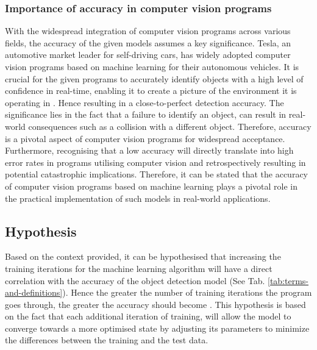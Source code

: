 \subsubsection{Importance of accuracy in computer vision programs}
With the widespread integration of computer vision programs across various fields, the accuracy of the given models assumes a key significance. Tesla, an automotive market leader for self-driving cars, has widely adopted computer vision programs based on machine learning for their autonomous vehicles. It is crucial for the given programs to accurately identify objects with a high level of confidence in real-time, enabling it to create a picture of the environment it is operating in \parencite{Baeldung2022}. Hence resulting in a close-to-perfect detection accuracy. The significance lies in the fact that a failure to identify an object, can result in real-world consequences such as a collision with a different object. Therefore, accuracy is a pivotal aspect of computer vision programs for widespread acceptance. Furthermore, recognising that a low accuracy will directly translate into high error rates in programs utilising computer vision and retrospectively resulting in potential catastrophic implications. Therefore, it can be stated that the accuracy of computer vision programs based on machine learning plays a pivotal role in the practical implementation of such models in real-world applications. \\


\subsection{Hypothesis}
Based on the context provided, it can be hypothesised that increasing the training iterations for the machine learning algorithm will have a direct correlation with the accuracy of the object detection model (See Tab. \ref{tab:terms-and-definitions}). Hence the greater the number of training iterations the program goes through, the greater the accuracy should become \parencite[p.~362--371]{Nagaki2021}. This hypothesis is based on the fact that each additional iteration of training, will allow the model to converge towards a more optimised state by adjusting its parameters to minimize the differences between the training and the test data.\\


